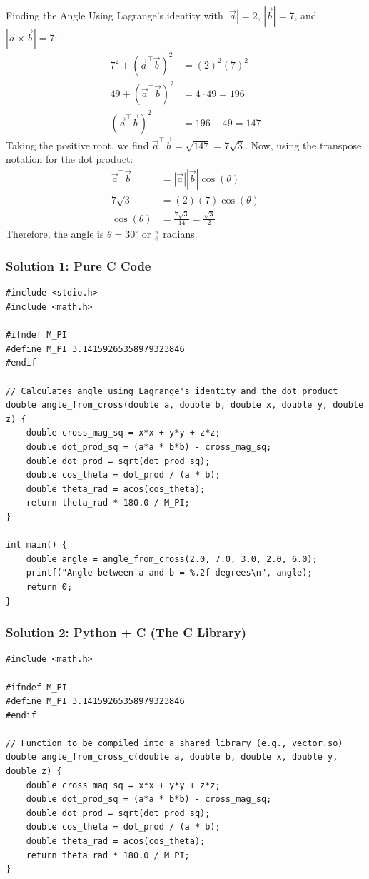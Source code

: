 \documentclass{beamer}
\begin{document}
\begin{frame}{Finding the Angle}
Using Lagrange's identity with $|\vec{a}|=2$, $|\vec{b}|=7$, and $|\vec{a} \times \vec{b}|=7$:
\begin{align*}
7^2 + (\vec{a}^\top\vec{b})^2 &= (2)^2 (7)^2 \\
49 + (\vec{a}^\top\vec{b})^2 &= 4 \cdot 49 = 196 \\
(\vec{a}^\top\vec{b})^2 &= 196 - 49 = 147
\end{align*}
Taking the positive root, we find $\vec{a}^\top\vec{b} = \sqrt{147} = 7\sqrt{3}$.
\vspace{1em}
Now, using the transpose notation for the dot product:
\begin{align*}
\vec{a}^\top\vec{b} &= |\vec{a}| |\vec{b}| \cos(\theta) \\
7\sqrt{3} &= (2)(7) \cos(\theta) \\
\cos(\theta) &= \frac{7\sqrt{3}}{14} = \frac{\sqrt{3}}{2}
\end{align*}
Therefore, the angle is $\theta = 30^\circ$ or $\frac{\pi}{6}$ radians.
\end{frame}


\begin{frame}[fragile]
    \frametitle{Solution 1: Pure C Code}
    \begin{lstlisting}
#include <stdio.h>
#include <math.h>

#ifndef M_PI
#define M_PI 3.14159265358979323846
#endif

// Calculates angle using Lagrange's identity and the dot product
double angle_from_cross(double a, double b, double x, double y, double z) {
    double cross_mag_sq = x*x + y*y + z*z;
    double dot_prod_sq = (a*a * b*b) - cross_mag_sq;
    double dot_prod = sqrt(dot_prod_sq);
    double cos_theta = dot_prod / (a * b);
    double theta_rad = acos(cos_theta);
    return theta_rad * 180.0 / M_PI;
}

int main() {
    double angle = angle_from_cross(2.0, 7.0, 3.0, 2.0, 6.0);
    printf("Angle between a and b = %.2f degrees\n", angle);
    return 0;
}
    \end{lstlisting}
\end{frame}

\begin{frame}[fragile]
    \frametitle{Solution 2: Python + C (The C Library)}
        \begin{lstlisting}
#include <math.h>

#ifndef M_PI
#define M_PI 3.14159265358979323846
#endif

// Function to be compiled into a shared library (e.g., vector.so)
double angle_from_cross_c(double a, double b, double x, double y, double z) {
    double cross_mag_sq = x*x + y*y + z*z;
    double dot_prod_sq = (a*a * b*b) - cross_mag_sq;
    double dot_prod = sqrt(dot_prod_sq);
    double cos_theta = dot_prod / (a * b);
    double theta_rad = acos(cos_theta);
    return theta_rad * 180.0 / M_PI;
}
    \end{lstlisting}
\end{frame}
\end{document}
